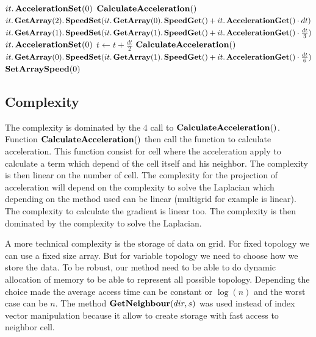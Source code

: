\begin{algorithm}
\begin{algorithmic}[1]
            \State $it.\mathop{\textbf{AccelerationSet}}(0)$
        \EndFor
        \State $\mathop{\textbf{CalculateAcceleration}}()$
            \State $it.\mathop{\textbf{GetArray}}(2).\mathop{\textbf{SpeedSet}}(it.\mathop{\textbf{GetArray}}(0).\mathop{\textbf{SpeedGet}}()+it.\mathop{\textbf{AccelerationGet}}()\cdot dt)$
            \State $it.\mathop{\textbf{GetArray}}(1).\mathop{\textbf{SpeedSet}}(it.\mathop{\textbf{GetArray}}(1).\mathop{\textbf{SpeedGet}}()+it.\mathop{\textbf{AccelerationGet}}()\cdot \frac{dt}{3})$
        \EndFor
            \State $it.\mathop{\textbf{AccelerationSet}}(0)$
        \EndFor
        \State $t\gets t+\frac{dt}{2}$
        \State $\mathop{\textbf{CalculateAcceleration}}()$
            \State $it.\mathop{\textbf{GetArray}}(0).\mathop{\textbf{SpeedSet}}(it.\mathop{\textbf{GetArray}}(1).\mathop{\textbf{SpeedGet}}()+it.\mathop{\textbf{AccelerationGet}}()\cdot \frac{dt}{6})$
         \EndFor
        \State $\mathop{\textbf{SetArraySpeed}}(0)$
        \EndProcedure
        \end{algorithmic}
\end{algorithm}

\subsection{Complexity}

The complexity is dominated by the $4$ call to $\mathop{\textbf{CalculateAcceleration}}()$.
Function $\mathop{\textbf{CalculateAcceleration}}()$ then call the function to calculate acceleration.
This function consist for cell where the acceleration apply to calculate a term which depend of the cell itself and his neighbor.
The complexity is then linear on the number of cell.
The complexity for the projection of acceleration will depend on the complexity to solve the Laplacian which depending
on the method used can be linear (multigrid for example is linear). The complexity to calculate the gradient is linear too.
The complexity is then dominated by the complexity to solve the Laplacian.

A more technical complexity is the storage of data on grid. For fixed topology we can use a fixed size array.
But for variable topology we need to choose how we store the data.
To be robust, our method need to be able to do dynamic allocation of memory to be able to represent all possible topology.
Depending the choice made the average access time can be constant or $\log(n)$ and the worst case can be $n$.
The method $\mathop{\textbf{GetNeighbour}}(dir,s)$ was used instead of index vector manipulation because it allow to create storage
with fast access to neighbor cell.

